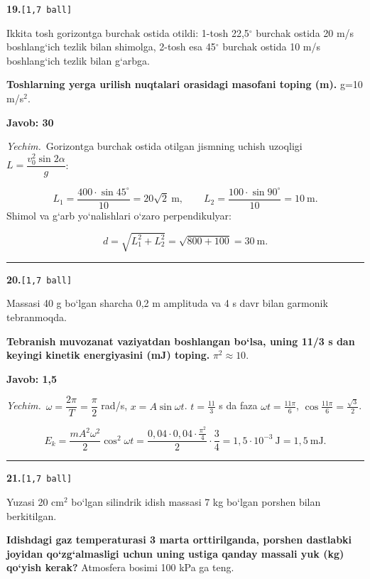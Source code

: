 \documentclass[11pt,a4paper]{article}
\newcommand{\ball}[1]{\hfill\texttt{[#1 ball]}}
\newcommand{\qhead}[2]{\Needspace{10\baselineskip}\noindent\textbf{#1.}\ball{#2}\par\nopagebreak}
\newenvironment{qbody}{\begin{list}{}{\leftmargin=8mm\rightmargin=0pt\topsep=0pt\itemsep=0pt\parsep=3pt}\item\relax}{\end{list}}
\begin{document}
\qhead{19}{1,7}
\begin{qbody}
Ikkita tosh gorizontga burchak ostida otildi: 1-tosh 22,5$^\circ$ burchak ostida 20 m/s boshlang‘ich tezlik bilan shimolga, 2-tosh esa 45$^\circ$ burchak ostida 10 m/s boshlang‘ich tezlik bilan g‘arbga.\par
\textbf{Toshlarning yerga urilish nuqtalari orasidagi masofani toping (m).} g=10 m/s$^{2}$.\par
\end{qbody}
\noindent\colorbox{gray!12}{\parbox{\dimexpr\linewidth-2\fboxsep}{\textbf{Javob: 30}}}\par\smallskip
\noindent\textit{Yechim.}\ Gorizontga burchak ostida otilgan jismning uchish uzoqligi $L=\dfrac{v_0^2\sin2\alpha}{g}$:\par
\[L_1=\frac{400\cdot\sin45^\circ}{10}=20\sqrt2\ \text{m},\qquad L_2=\frac{100\cdot\sin90^\circ}{10}=10\ \text{m}.\]
Shimol va g‘arb yo‘nalishlari o‘zaro perpendikulyar:\par
\[d=\sqrt{L_1^2+L_2^2}=\sqrt{800+100}=30\ \text{m}.\]\par\medskip\hrule\medskip
\qhead{20}{1,7}
\begin{qbody}
Massasi 40 g bo‘lgan sharcha 0,2 m amplituda va 4 s davr bilan garmonik tebranmoqda.\par
\textbf{Tebranish muvozanat vaziyatdan boshlangan bo‘lsa, uning 11/3 s dan keyingi kinetik energiyasini (mJ) toping.} $\pi^2 \approx 10$.\par
\end{qbody}
\noindent\colorbox{gray!12}{\parbox{\dimexpr\linewidth-2\fboxsep}{\textbf{Javob: 1,5}}}\par\smallskip
\noindent\textit{Yechim.}\ $\omega=\dfrac{2\pi}{T}=\dfrac{\pi}{2}$ rad/s, $x=A\sin\omega t$. $t=\frac{11}{3}$ s da faza $\omega t=\frac{11\pi}{6}$, $\cos\frac{11\pi}{6}=\frac{\sqrt3}{2}$.\par
\[E_k=\frac{mA^2\omega^2}{2}\cos^2\omega t=\frac{0{,}04\cdot0{,}04\cdot\frac{\pi^2}{4}}{2}\cdot\frac34=1{,}5\cdot10^{-3}\ \text{J}=1{,}5\ \text{mJ}.\]\par\medskip\hrule\medskip
\qhead{21}{1,7}
\begin{qbody}
Yuzasi 20 cm$^{2}$ bo‘lgan silindrik idish massasi 7 kg bo‘lgan porshen bilan berkitilgan.\par
\textbf{Idishdagi gaz temperaturasi 3 marta orttirilganda, porshen dastlabki joyidan qo‘zg‘almasligi uchun uning ustiga qanday massali yuk (kg) qo‘yish kerak?} Atmosfera bosimi 100 kPa ga teng.\par
\end{qbody}
\end{document}
